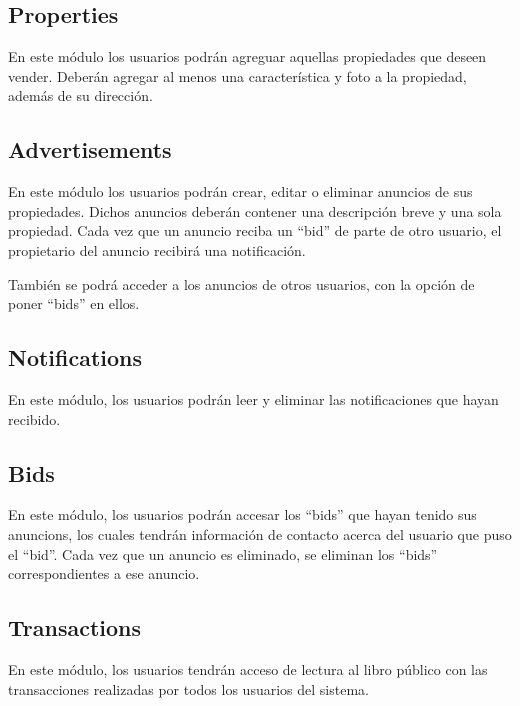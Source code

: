 \documentclass{article}
\begin{document}
\subsection{Properties}
En este m\'odulo los usuarios podr\'an agreguar aquellas propiedades que deseen vender. Deber\'an agregar al menos una caracter\'istica y foto a la propiedad, adem\'as de su direcci\'on.

\subsection{Advertisements}
En este m\'odulo los usuarios podr\'an crear, editar o eliminar anuncios de sus propiedades. Dichos anuncios deber\'an contener una descripci\'on breve y una sola propiedad. Cada vez que un anuncio reciba un ``bid'' de parte de otro usuario, el propietario del anuncio recibir\'a una notificaci\'on.

Tambi\'en se podr\'a acceder a los anuncios de otros usuarios, con la opci\'on de poner ``bids'' en ellos.

\subsection{Notifications}
En este m\'odulo, los usuarios podr\'an leer y eliminar las notificaciones que hayan recibido.

\subsection{Bids}
En este m\'odulo, los usuarios podr\'an accesar los ``bids'' que hayan tenido sus anuncions, los cuales tendr\'an informaci\'on de contacto acerca del usuario que puso el ``bid''. Cada vez que un anuncio es eliminado, se eliminan los ``bids'' correspondientes a ese anuncio.

\subsection{Transactions}
En este m\'odulo, los usuarios tendr\'an acceso de lectura al libro p\'ublico con las transacciones realizadas por todos los usuarios del sistema.
\end{document}
